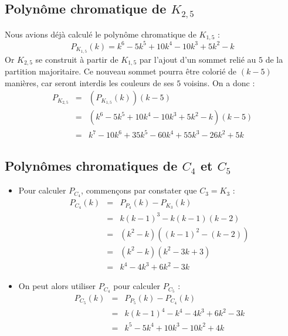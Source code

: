 \subsection{Polynôme chromatique de $K_{2,5}$}
Nous avions déjà calculé le polynôme chromatique de $K_{1,5}$ :
\[ P_{K_{1,5}}(k) = k^6 - 5k^5  + 10k^4 - 10k^3 + 5k^2 - k \]
Or $K_{2,5}$ se construit à partir de $K_{1,5}$ par l'ajout d'un sommet relié au $5$ de la partition majoritaire. Ce nouveau sommet pourra être colorié de $(k-5)$ manières, car seront interdis les couleurs de ses $5$ voisins. On a donc :
\begin{eqnarray*}
P_{K_{2,5}} & = &	(P_{K_{1,5}}(k))(k-5)								\\
			& = & 	(k^6 - 5k^5  + 10k^4 - 10k^3 + 5k^2 - k)(k-5)		\\	
			& = &	k^7 - 10k^6 + 35k^5 - 60k^4 + 55k^3 - 26k^2 + 5k	
\end{eqnarray*}

\subsection{Polynômes chromatiques de $C_4$ et $C_5$}
\begin {itemize}
\item Pour calculer $P_{C_4}$, commençons par constater que $C_3 = K_3$ :
\begin{eqnarray*}
P_{C_4}(k)	& = &	P_{P_4}(k) - P_{K_3}(k)				\\
			& = & 	k(k-1)^3 - k(k-1)(k-2)				\\
			& = & 	(k^2 - k)((k-1)^2 - (k-2))			\\
			& = &	(k^2 - k)(k^2 - 3k + 3)				\\
			& = & 	k^4 - 4k^3 + 6k^2 - 3k							
\end{eqnarray*}
\item On peut alors utiliser $P_{C_4}$ pour calculer $P_{C_5}$ :
\begin{eqnarray*}
P_{C_5}(k)	& = &	P_{P_5}(k) - P_{C_4}(k)				\\
			& = & 	k(k-1)^4 - k^4 -4k^3 + 6k^2 - 3k	\\
			& = &	k^5 - 5k^4 + 10k^3 - 10k^2 + 4k		 
\end{eqnarray*}
\end {itemize}

